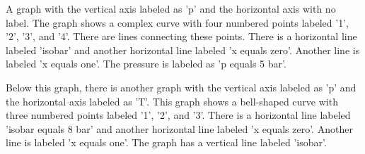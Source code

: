 A graph with the vertical axis labeled as 'p' and the horizontal axis with no label. The graph shows a complex curve with four numbered points labeled '1', '2', '3', and '4'. There are lines connecting these points. There is a horizontal line labeled 'isobar' and another horizontal line labeled 'x equals zero'. Another line is labeled 'x equals one'. The pressure is labeled as 'p equals 5 bar'.

Below this graph, there is another graph with the vertical axis labeled as 'p' and the horizontal axis labeled as 'T'. This graph shows a bell-shaped curve with three numbered points labeled '1', '2', and '3'. There is a horizontal line labeled 'isobar equals 8 bar' and another horizontal line labeled 'x equals zero'. Another line is labeled 'x equals one'. The graph has a vertical line labeled 'isobar'.